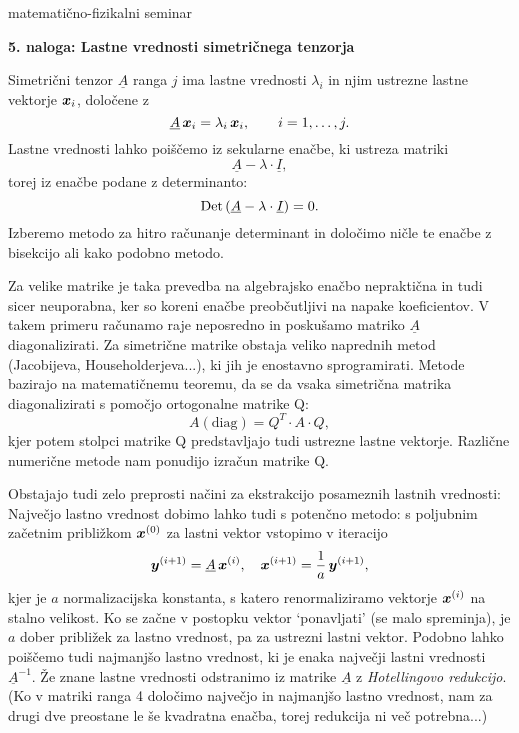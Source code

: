 \documentclass[12pt]{article}
\newcommand{\bi}[1]{\hbox{\boldmath{$#1$}}}
\begin{document}
\thispagestyle{empty}


\setcounter{equation}{0}
\centerline{\sc matematično-fizikalni seminar~\thisyear}
\bigskip
\setcounter{equation}{0}
\centerline{\bf 5. naloga: Lastne vrednosti simetričnega tenzorja}
\bigskip
\bigskip

Simetrični tenzor $\underline{A}$ ranga $j$ ima lastne vrednosti $\lambda_i$
in njim ustrezne lastne vektorje $\bi{x}_i$, določene z
\[
\underline{A}\,\bi{x}_i = \lambda_i\,\bi{x}_i , \qquad i=1, \ldots, j.
\]
Lastne vrednosti lahko poiščemo iz sekularne enačbe, ki ustreza
matriki
\[
\underline{A} - \lambda\cdot\underline{I},
\]
torej iz enačbe podane z determinanto:
\[
{\rm Det}\,(\underline{A}-\lambda\cdot\underline{I}) = 0.
\]
Izberemo metodo za hitro računanje determinant in določimo ničle
te enačbe z bisekcijo ali kako podobno metodo.

Za velike matrike je taka prevedba na algebrajsko enačbo
nepraktična in tudi sicer neuporabna, ker so koreni enačbe
preobčutljivi na napake koeficientov. V takem primeru
računamo raje neposredno in poskušamo matriko $\underline{A}$ diagonalizirati.
Za simetrične matrike obstaja veliko naprednih metod (Jacobijeva, Householderjeva...),
ki jih je enostavno sprogramirati. Metode bazirajo na matematičnemu teoremu, da
se da vsaka simetrična matrika diagonalizirati s pomočjo ortogonalne matrike Q:
\[
A(\mathrm{diag}) = Q^T \cdot A \cdot Q,
\]
kjer potem stolpci matrike Q predstavljajo tudi ustrezne lastne vektorje. Različne
numerične metode nam ponudijo izračun matrike Q.


Obstajajo tudi zelo preprosti načini za ekstrakcijo posameznih lastnih vrednosti:
Največjo lastno vrednost dobimo lahko tudi s potenčno metodo:
s poljubnim začetnim približkom $\bi{x}^{(0)}$
za lastni vektor vstopimo v iteracijo
\[
\bi{y}^{(i+1)} = \underline{A}\,\bi{x}^{(i)},
\quad \bi{x}^{(i+1)} = \frac{1}{a}\,\bi{y}^{(i+1)},
\]
kjer je $a$ normalizacijska konstanta, s katero renormaliziramo
vektorje $\bi{x}^{(i)}$ na stalno velikost. Ko se začne v postopku vektor
\bi{x} `ponavljati' (se malo spreminja), je $a$ dober približek za lastno vrednost, \bi{x}
pa za ustrezni lastni vektor.  Podobno lahko poiščemo tudi najmanjšo
lastno vrednost, ki je enaka največji lastni vrednosti
$\underline{A}^{-1}$. Že znane lastne vrednosti odstranimo iz matrike $\underline{A}$ z \emph{Hotellingovo redukcijo}. (Ko v matriki ranga 4 določimo največjo in najmanjšo lastno vrednost, nam za drugi dve preostane le še
kvadratna enačba, torej redukcija ni več potrebna...)
\end{document}
